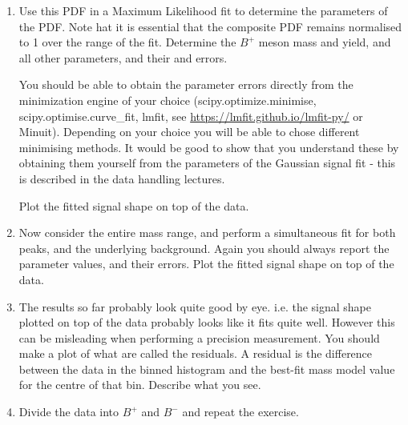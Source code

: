 \begin{enumerate}
\item	Use this PDF in a Maximum Likelihood fit to determine the parameters of the PDF. Note hat it is essential that the composite PDF remains normalised to 1 over the range of the fit. Determine the $B^+$ meson mass and yield, and all other parameters, and their and errors.

You should be able to obtain the parameter errors directly from the minimization engine of your choice (scipy.optimize.minimise, scipy.optimise.curve\_fit, lmfit, see \url{https://lmfit.github.io/lmfit-py/} or Minuit). Depending on your choice you will be able to chose different minimising methods.
It would be good to show that you understand these by obtaining them yourself from the parameters of the Gaussian signal fit - this is described in the data handling lectures.

Plot the fitted signal shape on top of the data.

\item Now consider the entire mass range, and perform a simultaneous fit for both
peaks, and the underlying background. Again you should always report the parameter
values, and their errors. Plot the fitted signal shape on top of the data.
\item The results so far probably look quite good by eye. i.e. the signal shape plotted on
top of the data probably looks like it fits quite well. However this can be misleading
when performing a precision measurement. You should make a plot of what are called
the residuals. A residual is the difference between the data in the binned histogram
and the best-fit mass model value for the centre of that bin. Describe what you see.
\item Divide the data into $B^+$ and $B^-$ and repeat the exercise.


\end{enumerate}
